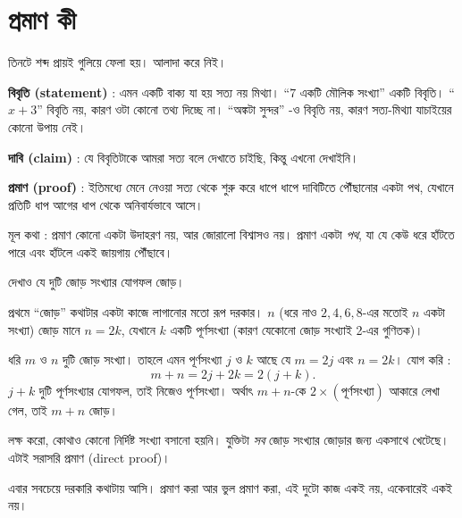 \documentclass[11pt]{article}
\begin{document}
\section{প্রমাণ কী}

\noindent
তিনটে শব্দ প্রায়ই গুলিয়ে ফেলা হয়। আলাদা করে নিই।

\begin{idea}[বিবৃতি, দাবি, প্রমাণ]
\textbf{বিবৃতি (statement)} : এমন একটি বাক্য যা হয় সত্য নয় মিথ্যা।
``$7$ একটি মৌলিক সংখ্যা'' একটি বিবৃতি। ``$x + 3$'' বিবৃতি নয়, কারণ ওটা কোনো তথ্য দিচ্ছে না। ``অঙ্কটা সুন্দর'' -ও বিবৃতি নয়, কারণ সত্য-মিথ্যা যাচাইয়ের
কোনো উপায় নেই।

\textbf{দাবি (claim)} : যে বিবৃতিটাকে আমরা সত্য বলে দেখাতে চাইছি, কিন্তু
এখনো দেখাইনি।

\textbf{প্রমাণ (proof)} : ইতিমধ্যে মেনে নেওয়া সত্য থেকে শুরু করে ধাপে ধাপে
দাবিটিতে পৌঁছানোর একটা পথ, যেখানে প্রতিটি ধাপ আগের ধাপ থেকে অনিবার্যভাবে আসে।

মূল কথা : প্রমাণ কোনো একটা উদাহরণ নয়, আর জোরালো বিশ্বাসও নয়। প্রমাণ একটা
\emph{পথ}, যা যে কেউ ধরে হাঁটতে পারে এবং হাঁটলে একই জায়গায় পৌঁছাবে।
\end{idea}

\begin{example}
দেখাও যে দুটি জোড় সংখ্যার যোগফল জোড়।
\end{example}

\begin{solbox}
প্রথমে ``জোড়'' কথাটার একটা কাজে লাগানোর মতো রূপ দরকার। $n$ (ধরে নাও $2, 4, 6, 8$-এর মতোই $n$ একটা সংখ্যা) জোড় মানে $n = 2k$,
যেখানে $k$ একটি পূর্ণসংখ্যা (কারণ যেকোনো জোড় সংখ্যাই 2-এর গুণিতক)।

ধরি $m$ ও $n$ দুটি জোড় সংখ্যা। তাহলে এমন পূর্ণসংখ্যা $j$ ও $k$ আছে যে
$m = 2j$ এবং $n = 2k$। যোগ করি :
\[
  m + n = 2j + 2k = 2(j+k) .
\]
$j + k$ দুটি পূর্ণসংখ্যার যোগফল, তাই নিজেও পূর্ণসংখ্যা। অর্থাৎ $m+n$-কে
$2 \times (\text{পূর্ণসংখ্যা})$ আকারে লেখা গেল, তাই $m+n$ জোড়।

লক্ষ করো, কোথাও কোনো নির্দিষ্ট সংখ্যা বসানো হয়নি। যুক্তিটা \emph{সব} জোড়
সংখ্যার জোড়ার জন্য একসাথে খেটেছে। এটাই সরাসরি প্রমাণ (direct proof)।
\end{solbox}

\noindent
এবার সবচেয়ে দরকারি কথাটায় আসি। প্রমাণ করা আর ভুল প্রমাণ করা, এই দুটো কাজ
একই নয়, একেবারেই একই নয়।
\end{document}
